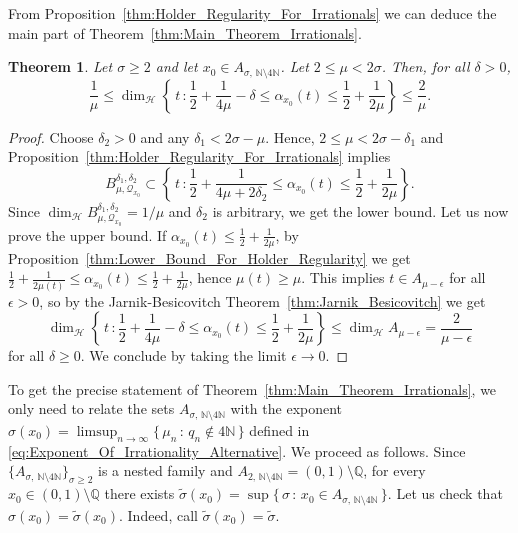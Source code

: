 \documentclass[11pt,reqno]{amsart}
\newtheorem{thm}{Theorem}[section]
\theoremstyle{definition}
\begin{document}
From Proposition~\ref{thm:Holder_Regularity_For_Irrationals} we can deduce the main part of Theorem~\ref{thm:Main_Theorem_Irrationals}. 
\begin{thm}\label{thm:Theorem_For_Irrationals}
Let $\sigma \geq 2$ and let $x_0 \in A_{\sigma,  \, \mathbb N \setminus 4\mathbb N}$. 
Let $2 \leq  \mu  < 2\sigma$. Then, for all $\delta > 0$, 
\begin{equation}
\frac{1}{\mu} \leq \operatorname{dim}_{\mathcal H} \left\{   \, t \, : \frac12 + \frac{1}{4\mu} - \delta  \leq \alpha_{x_0}(t) \leq \frac12 + \frac{1}{2\mu}    \right\}  \leq \frac{2}{\mu}.
\end{equation}
\end{thm} 
\begin{proof}
Choose $\delta_2 > 0$ 
and any $\delta_1 < 2\sigma - \mu$. 
Hence, $2 \leq \mu < 2\sigma - \delta_1 $
and Proposition~\ref{thm:Holder_Regularity_For_Irrationals} implies 
\begin{equation}
B^{\delta_1,\delta_2}_{\mu,\mathcal Q_{x_0}} 
 \subset \left\{   \, t \, : \frac12 + \frac{1}{4\mu + 2\delta_2} \leq \alpha_{x_0}(t) \leq \frac12 + \frac{1}{2\mu}    \right\}.
\end{equation}
Since $\operatorname{dim}_{\mathcal H} B^{\delta_1, \delta_2}_{\mu,\mathcal Q_{x_0}}  = 1/\mu$
and $\delta_2$ is arbitrary, 
we get the lower bound.
Let us now prove the upper bound. 
If $\alpha_{x_0}(t) \leq \frac12 + \frac{1}{2\mu}$, 
by Proposition~\ref{thm:Lower_Bound_For_Holder_Regularity} we get
$ \frac12 + \frac{1}{2\mu(t)} \leq \alpha_{x_0}(t) \leq \frac12 + \frac{1}{2\mu} $, 
hence $\mu(t) \geq \mu$. This implies $t \in A_{\mu-\epsilon}$ for all $\epsilon >0$,
so by the Jarnik-Besicovitch Theorem~\ref{thm:Jarnik_Besicovitch} we get
\begin{equation}
 \operatorname{dim}_{\mathcal H} \left\{   \, t \, : \frac12 + \frac{1}{4\mu} - \delta \leq \alpha_{x_0}(t) \leq \frac12 + \frac{1}{2\mu}    \right\}
  \leq
   \operatorname{dim}_{\mathcal H}  A_{\mu - \epsilon}
   = \frac{2}{\mu - \epsilon} 
\end{equation}
for all $\delta \geq 0$. We conclude by taking the limit $\epsilon \to 0$. 
\end{proof}

To get the precise statement of Theorem~\ref{thm:Main_Theorem_Irrationals}, 
we only need to relate the sets $A_{\sigma,  \, \mathbb N \setminus 4\mathbb N}$ with the exponent 
$\sigma(x_0) = \limsup_{n \to \infty} \{ \, \mu_n \, : \, q_n \not\in 4\mathbb N \, \}$ defined in \eqref{eq:Exponent_Of_Irrationality_Alternative}. 
We proceed as follows.
Since $\{A_{\sigma,  \, \mathbb N \setminus 4\mathbb N}\}_{\sigma \geq 2}$ is a nested family
and $A_{2,  \, \mathbb N \setminus 4\mathbb N} = (0,1) \setminus \mathbb Q$, 
for every $x_0 \in (0,1) \setminus \mathbb Q$ there exists $\widetilde{\sigma}(x_0) = \sup\{ \, \sigma \, : \, x_0 \in A_{\sigma,  \, \mathbb N \setminus 4\mathbb N} \,  \}$. 
Let us check that $\sigma(x_0) = \widetilde \sigma (x_0)$.
Indeed, call $\widetilde \sigma(x_0) = \widetilde\sigma$. 
\end{document}
